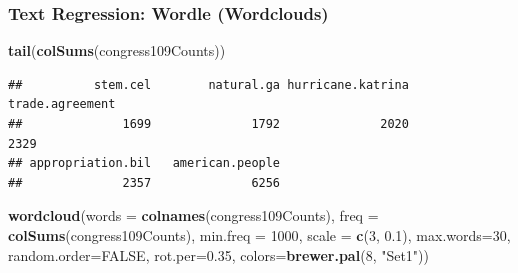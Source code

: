 \documentclass[
  shownotes,
  xcolor={svgnames},
  hyperref={colorlinks,citecolor=DarkBlue,linkcolor=DarkRed,urlcolor=DarkBlue}
  , aspectratio=169]{beamer}
\newenvironment{Shaded}{\begin{snugshade}}{\end{snugshade}}
\newcommand{\DataTypeTok}[1]{\textcolor[rgb]{0.13,0.29,0.53}{#1}}
\newcommand{\DecValTok}[1]{\textcolor[rgb]{0.00,0.00,0.81}{#1}}
\newcommand{\FloatTok}[1]{\textcolor[rgb]{0.00,0.00,0.81}{#1}}
\newcommand{\KeywordTok}[1]{\textcolor[rgb]{0.13,0.29,0.53}{\textbf{#1}}}
\newcommand{\NormalTok}[1]{#1}
\newcommand{\OtherTok}[1]{\textcolor[rgb]{0.56,0.35,0.01}{#1}}
\newcommand{\StringTok}[1]{\textcolor[rgb]{0.31,0.60,0.02}{#1}}
\begin{document}
\begin{frame}[fragile]
\frametitle{Text Regression: Wordle (Wordclouds)}


\begin{scriptsize}


\begin{Shaded}
\begin{Highlighting}[]
\KeywordTok{tail}\NormalTok{(}\KeywordTok{colSums}\NormalTok{(congress109Counts))}
\end{Highlighting}
\end{Shaded}
\end{scriptsize}
\begin{tiny}



\begin{verbatim}
##          stem.cel        natural.ga hurricane.katrina   trade.agreement 
##              1699              1792              2020              2329 
## appropriation.bil   american.people 
##              2357              6256
\end{verbatim}
\end{tiny}

\begin{scriptsize}



\begin{Shaded}
\begin{Highlighting}[]
\KeywordTok{wordcloud}\NormalTok{(}\DataTypeTok{words =} \KeywordTok{colnames}\NormalTok{(congress109Counts), }
          \DataTypeTok{freq =} \KeywordTok{colSums}\NormalTok{(congress109Counts),}
          \DataTypeTok{min.freq =} \DecValTok{1000}\NormalTok{, }
          \DataTypeTok{scale =} \KeywordTok{c}\NormalTok{(}\DecValTok{3}\NormalTok{, }\FloatTok{0.1}\NormalTok{), }\DataTypeTok{max.words=}\DecValTok{30}\NormalTok{, }
          \DataTypeTok{random.order=}\OtherTok{FALSE}\NormalTok{, }\DataTypeTok{rot.per=}\FloatTok{0.35}\NormalTok{, }
          \DataTypeTok{colors=}\KeywordTok{brewer.pal}\NormalTok{(}\DecValTok{8}\NormalTok{, }\StringTok{"Set1"}\NormalTok{))}
\end{Highlighting}
\end{Shaded}

\end{scriptsize}



\end{frame}
\end{document}
